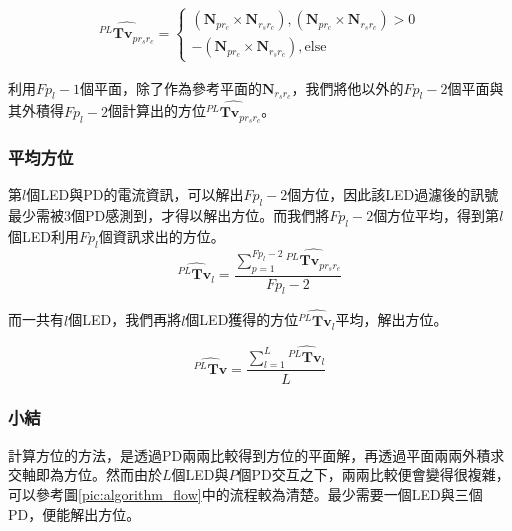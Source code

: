         \begin{gather}
            \label{eqn:solve_axis}
             \hat{{^{PL}\boldsymbol{Tv}}_{p{r_sr_c}}} = 
             \begin{cases}
                (\boldsymbol{N}_{pr_c}\times \boldsymbol{N}_{r_sr_c}),(\boldsymbol{N}_{pr_c}\times \boldsymbol{N}_{r_sr_c})>0\\
                -(\boldsymbol{N}_{pr_c}\times \boldsymbol{N}_{r_sr_c}),\text{else}
             \end{cases}
        \end{gather}

        利用$Fp_l-1$個平面，除了作為參考平面的$\boldsymbol{N}_{r_sr_c}$，我們將他以外的$Fp_l-2$個平面與其外積得$Fp_l-2$個計算出的方位$\hat{{^{PL}\boldsymbol{Tv}}_{p{r_sr_c}}}$。


    \subsubsection{平均方位}
    \label{chp:orient_average}

        第$l$個LED與PD的電流資訊，可以解出$Fp_l-2$個方位，因此該LED過濾後的訊號最少需被3個PD感測到，才得以解出方位。而我們將$Fp_l-2$個方位平均，得到第$l$個LED利用$Fp_l$個資訊求出的方位。
        \begin{equation}
            \label{eqn:average_orient_led}
            \hat{{^{PL}\boldsymbol{Tv}}_{l}} = \frac{\sum^{Fp_l-2}_{p=1}\hat{{^{PL}\boldsymbol{Tv}}_{p{r_sr_c}}}}{Fp_l-2}
        \end{equation}

        而一共有$l$個LED，我們再將$l$個LED獲得的方位$\hat{{^{PL}\boldsymbol{Tv}}_{l}}$平均，解出方位。

        \begin{equation}
            \label{eqn:average_orient}
            \hat{{^{PL}\boldsymbol{Tv}}} = \frac{\sum^{L}_{l=1}\hat{{^{PL}\boldsymbol{Tv}}_{l}}}{L}
        \end{equation}
        
        
    \subsubsection{小結}
    \label{chp:orient_conclu}

    計算方位的方法，是透過PD兩兩比較得到方位的平面解，再透過平面兩兩外積求交軸即為方位。然而由於$L$個LED與$P$個PD交互之下，兩兩比較便會變得很複雜，可以參考圖\ref{pic:algorithm_flow}中的流程較為清楚。最少需要一個LED與三個PD，便能解出方位。

